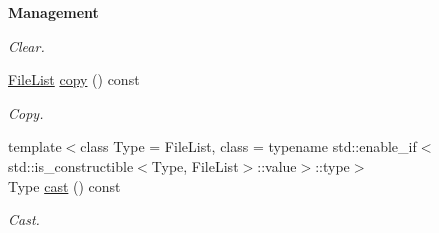 \begin{Indent}{\bf Management}
\begin{DoxyCompactItemize}
\begin{DoxyCompactList}\small\item\em Clear. \end{DoxyCompactList}\item 
\hyperlink{exceptionmagrathea_1_1FileList}{File\-List} \hyperlink{exceptionmagrathea_1_1FileList_a952b38164c5261dc27468a92cc787568}{copy} () const 
\begin{DoxyCompactList}\small\item\em Copy. \end{DoxyCompactList}\item 
{\footnotesize template$<$class Type  = File\-List, class  = typename std\-::enable\-\_\-if$<$std\-::is\-\_\-constructible$<$\-Type, File\-List$>$\-::value$>$\-::type$>$ }\\Type \hyperlink{exceptionmagrathea_1_1FileList_a787a43310a04b8e857061c7bb5fabd15}{cast} () const 
\begin{DoxyCompactList}\small\item\em Cast. \end{DoxyCompactList}\end{DoxyCompactItemize}
\end{Indent}
